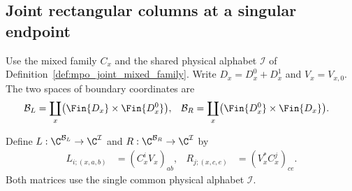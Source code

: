 
\subsection{Joint rectangular columns at a singular endpoint}
\label{sec:mpo_joint_boundary_columns}

Use the mixed family $C_x$ and the shared physical alphabet $\mathcal I$
of Definition~\ref{def:mpo_joint_mixed_family}. Write
$D_x=D_x^0+D_x^1$ and $V_x=V_{x,0}$. The two spaces of boundary
coordinates are
\begin{align}
    \mathcal B_L & =\coprod_x\bigl(\Fin{D_x}\times\Fin{D_x^0}\bigr),
                 & \mathcal B_R                                      & =\coprod_x\bigl(\Fin{D_x^0}\times\Fin{D_x}\bigr).
\end{align}

\begin{definition}
    \label{def:mpo_joint_boundary_columns}
    \leanok
    Define $L:\C^{\mathcal B_L}\to\C^{\mathcal I}$ and
    $R:\C^{\mathcal B_R}\to\C^{\mathcal I}$ by
    \begin{align}
        L_{i;(x,a,b)} & =(C_x^iV_x)_{ab},
                      & R_{j;(x,c,e)}     & =(V_x^*C_x^j)_{ce}.
    \end{align}
    Both matrices use the single common physical alphabet $\mathcal I$.
\end{definition}

